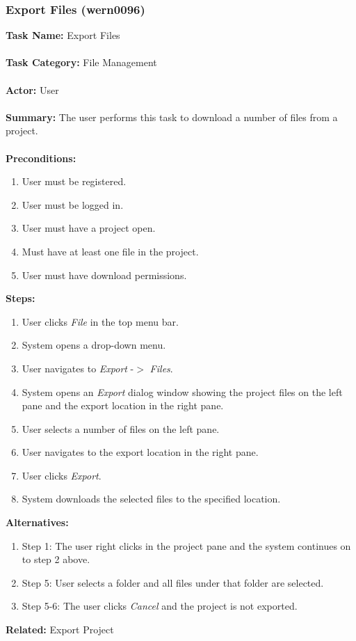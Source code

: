 \documentclass[11pt]{report}
\begin{document}
\newpage

\subsubsection{Export Files (wern0096)}
\begin{framed}
	\noindent\textbf{Task Name:} Export Files \\ \\
	\textbf{Task Category:} File Management \\ \\
	\textbf{Actor:} User \\ \\
	\textbf{Summary:} The user performs this task to download a number of files from a project. \\ \\
	\textbf{Preconditions:} 
	\begin{enumerate}
		\item User must be registered.
		\item User must be logged in.
		\item User must have a project open.
		\item Must have at least one file in the project.
		\item User must have download permissions.
	\end{enumerate}
	\textbf{Steps:}
	\begin{enumerate}
		\item User clicks \textit{File} in the top menu bar.
		\item System opens a drop-down menu.
		\item User navigates to \textit{Export} -$>$ \textit{Files}.
		\item System opens an \textit{Export} dialog window showing the project files on the left pane and the export location in the right pane.
		\item User selects a number of files on the left pane.
		\item User navigates to the export location in the right pane.
		\item User clicks \textit{Export}.
		\item System downloads the selected files to the specified location.
	\end{enumerate}
	\textbf{Alternatives:} 
	\begin{enumerate}
		\item Step 1: The user right clicks in the project pane and the system continues on to step 2 above.
		\item Step 5: User selects a folder and all files under that folder are selected.
		\item Step 5-6: The user clicks \textit{Cancel} and the project is not exported.
	\end{enumerate}
	\textbf{Related:} Export Project
\end{framed}
\end{document}
